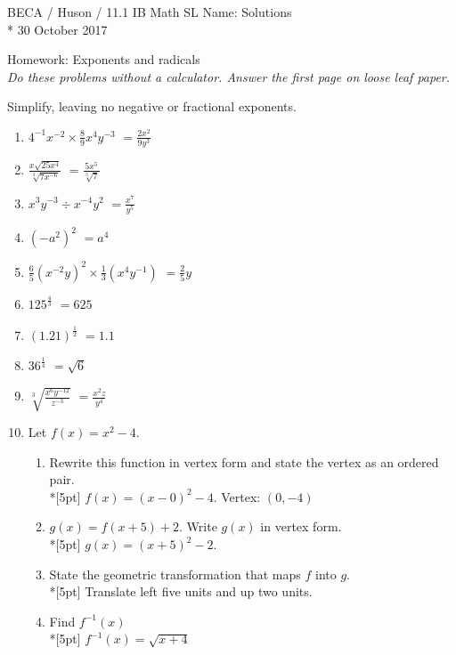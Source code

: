 \documentclass[]{book}
\begin{document}
\noindent BECA / Huson / 11.1 IB Math SL \hspace{2in} Name: \large{Solutions}\\*
30 October 2017
\begin{center}
{\Large Homework: Exponents and radicals}\\
\textit{Do these problems without a calculator. Answer the first page on loose leaf paper.}
\end{center}



Simplify, leaving no negative or fractional exponents.

\begin{enumerate}

\item $\displaystyle 4^{-1}x^{-2} \times \frac{8}{9}x^4 y^{-3}$ 
    $\displaystyle =\frac{2x^2}{9y^3}$\\[10pt]
\item $\displaystyle  \frac{x \sqrt{25x^4}}{\sqrt[3]{7x^{-6}}}$
    $\displaystyle =\frac{5x^5}{\sqrt[3]{7}}$\\[10pt]
\item $x^3 y^{-3} \div x^{-4} y^2$
    $\displaystyle =\frac{x^7}{y^5}$\\[10pt]
\item $(-a^2)^2$
    $=a^4$

\item $\displaystyle \frac{6}{5} (x^{-2} y)^2 \times \frac{1}{3}(x^4 y^{-1})$
    $\displaystyle =\frac{2}{5}y$\\[10pt]

\item $\displaystyle  125^\frac{4}{3}$
    $=625$
\item $\displaystyle  (1.21)^{\frac{1}{2}}$
    $=1.1$

\item $\displaystyle  36^\frac{1}{4}$
    $= \sqrt{6}$
\item $\displaystyle  \sqrt[3]{\frac{x^6 y^{-12}}{z^{-3}}}$
    $\displaystyle = \frac{x^2 z}{y^4}$\\[10pt]

\item Let $f(x) = x^2 - 4$.
\begin{enumerate}
    \item Rewrite this function in vertex form and state the vertex as an ordered pair.\\*[5pt]
        $f(x)=(x-0)^2-4$. Vertex: $(0,-4)$
    \item $g(x)=f(x+5)+2$. Write $g(x)$ in vertex form.\\*[5pt]
        $g(x)=(x+5)^2-2$.
    \item State the geometric transformation that maps $f$ into $g$.\\*[5pt]
        Translate left five units and up two units.
    \item Find $f^{-1}(x)$\\*[5pt]
        $f^{-1}(x)=\sqrt{x+4}$
\end{enumerate}


\end{enumerate}
\end{document}
